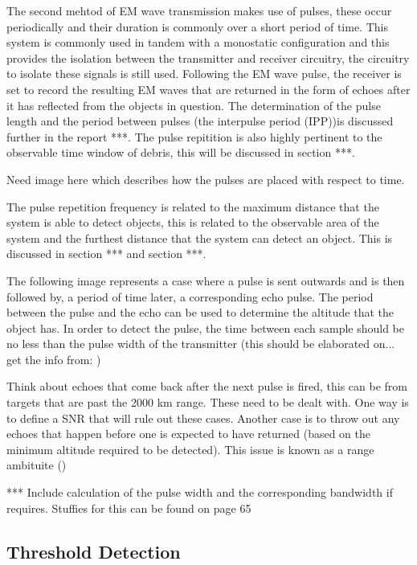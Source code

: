 \documentclass[11pt]{witseiepaper}
\begin{document}
The second mehtod of EM wave transmission makes use of pulses, these occur periodically and their duration is commonly over a short period of time. This system is commonly used in tandem with a monostatic configuration and this provides the isolation between the transmitter and receiver circuitry, the circuitry to isolate these signals is still used.
Following the EM wave pulse, the receiver is set to record the resulting EM waves that are returned in the form of echoes after it has reflected from the objects in question. The determination of the pulse length and the period between pulses (the interpulse period (IPP))is discussed further in the report ***. The pulse repitition is also highly pertinent to the observable time window of debris, this will be discussed in section ***.

Need image here which describes how the pulses are placed with respect to time.

The pulse repetition frequency is related to the maximum distance that the system is able to detect objects, this is related to the observable area of the system and the furthest distance that the system can detect an object. This is discussed in section *** and section ***.

The following image represents a case where a pulse is sent outwards and is then followed by, a period of time later, a corresponding echo pulse.
The period between the pulse and the echo can be used to determine the altitude that the object has.
In order to detect the pulse, the time between each sample should be no less than the pulse width of the transmitter (this should be elaborated on... get the info from: \cite[p.~21]{radarHandbook})

Think about echoes that come back after the next pulse is fired, this can be from targets that are past the 2000 km range. These need to be dealt with. One way is to define a SNR that will rule out these cases. Another case is to throw out any echoes that happen before one is expected to have returned (based on the minimum altitude required to be detected). 
This issue is known as a range ambituite (\cite[p~.22]{radarHandbook})

*** Include calculation of the pulse width and the corresponding bandwidth if requires. Stuffies for this can be found on page 65

\subsection{Threshold Detection}
\end{document}
